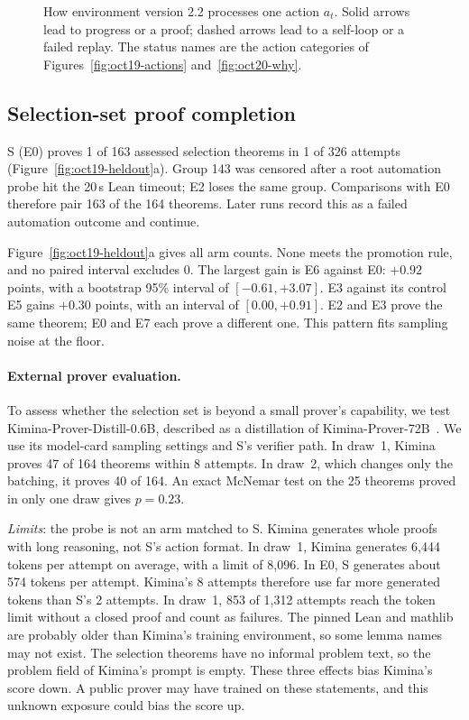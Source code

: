 \documentclass[11pt]{article}
\begin{document}
\begin{figure}[!htbp]
\begin{tikzpicture}[font=\small]
\end{tikzpicture}
\caption{How environment version 2.2 processes one action $a_t$. Solid arrows lead to progress or a proof; dashed arrows lead to a self-loop or a failed replay. The status names are the action categories of Figures~\ref{fig:oct19-actions} and~\ref{fig:oct20-why}.}
\label{fig:v22-action}
\end{figure}

\subsection{Selection-set proof completion}
\label{sec:oct19-heldout}

S (E0) proves 1 of 163 assessed selection theorems in 1 of 326 attempts (Figure~\ref{fig:oct19-heldout}a).
Group 143 was censored after a root automation probe hit the 20\,s Lean timeout; E2 loses the same group.
Comparisons with E0 therefore pair 163 of the 164 theorems.
Later runs record this as a failed automation outcome and continue.

Figure~\ref{fig:oct19-heldout}a gives all arm counts. None meets the promotion rule, and no paired interval excludes 0.
The largest gain is E6 against E0: $+0.92$ points, with a bootstrap 95\% interval of $[-0.61, +3.07]$.
E3 against its control E5 gains $+0.30$ points, with an interval of $[0.00, +0.91]$.
E2 and E3 prove the same theorem; E0 and E7 each prove a different one.
This pattern fits sampling noise at the floor.

\paragraph{External prover evaluation.}
To assess whether the selection set is beyond a small prover's capability, we test Kimina-Prover-Distill-0.6B, described as a distillation of Kimina-Prover-72B~\cite{kimina}.
We use its model-card sampling settings and S's verifier path.
In draw~1, Kimina proves 47 of 164 theorems within 8 attempts.
In draw~2, which changes only the batching, it proves 40 of 164.
An exact McNemar test on the 25 theorems proved in only one draw gives $p = 0.23$.

\emph{Limits}: the probe is not an arm matched to S.
Kimina generates whole proofs with long reasoning, not S's action format.
In draw~1, Kimina generates 6,444 tokens per attempt on average, with a limit of 8,096.
In E0, S generates about 574 tokens per attempt.
Kimina's 8 attempts therefore use far more generated tokens than S's 2 attempts.
In draw~1, 853 of 1,312 attempts reach the token limit without a closed proof and count as failures.
The pinned Lean and mathlib are probably older than Kimina's training environment, so some lemma names may not exist.
The selection theorems have no informal problem text, so the problem field of Kimina's prompt is empty.
These three effects bias Kimina's score down.
A public prover may have trained on these statements, and this unknown exposure could bias the score up.
\end{document}
